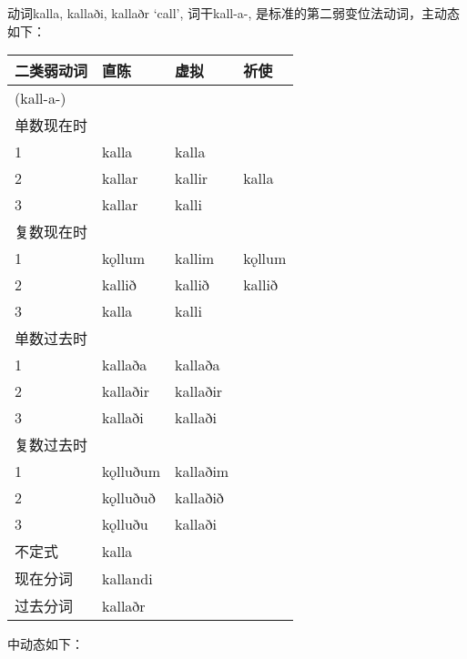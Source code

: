 动词kalla, kallaði, kallaðr `call‌', 词干kall-a-,
是标准的第二弱变位法动词，主动态如下：

\begin{longtable}{llll}
\toprule
二类弱动词 & 直陈 & 虚拟 & 祈使 \\
\midrule
\endhead
\bottomrule
\endfoot
(kall-a-) & & & \\
单数现在时 & & & \\
1 & kalla & kalla & \\
2 & kallar & kallir & kalla \\
3 & kallar & kalli & \\
复数现在时 & & & \\
1 & kǫllum & kallim & kǫllum \\
2 & kallið & kallið & kallið \\
3 & kalla & kalli & \\
单数过去时 & & & \\
1 & kallaða & kallaða & \\
2 & kallaðir & kallaðir & \\
3 & kallaði & kallaði & \\
复数过去时 & & & \\
1 & kǫlluðum & kallaðim & \\
2 & kǫlluðuð & kallaðið & \\
3 & kǫlluðu & kallaði & \\
不定式 & kalla & & \\
现在分词 & kallandi & & \\
过去分词 & kallaðr & & \\
\end{longtable}

中动态如下：

